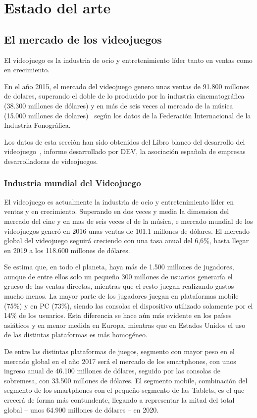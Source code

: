 \chapter{Estado del arte}
\label{chap:estado del arte}
\section{El mercado de los videojuegos}
El videojuego es la industria de ocio y entretenimiento líder tanto en ventas como en crecimiento.

En el año 2015, el mercado del videojuego genero unas ventas de 91.800 millones de dolares, superando el doble de lo producido por la industria cinematográfica (38.300 millones de dólares) y en más de seis veces al mercado de la música (15.000 millones de dolares)~\cite{libro_blanco} según los datos de la Federación Internacional de la Industria Fonográfica.

Los datos de esta sección han sido obtenidos del Libro blanco del desarrollo del videojuego~\cite{libro_blanco}, informe desarrollado por DEV, la asociación española de empresas desarrolladoras de videojuegos.

\subsection{Industria mundial del Videojuego}
El videojuego es actualmente la industria de ocio y entretenimiento líder en ventas y en crecimiento. Superando en dos veces y media la dimension del mercado del cine y en mas de seis veces el de la música, e mercado mundial de los videojuegos generó en 2016 unas ventas de 101.1 millones de dólares. El mercado global del videojuego seguirá creciendo con una tasa anual del 6,6\%, hasta llegar en 2019 a los 118.600 millones de dólares.

Se estima que, en todo el planeta, haya más de 1.500 millones de jugadores, aunque de entre ellos solo un pequeño 300 millones de usuarios generaría el grueso de las ventas directas, mientras que el resto juegan realizando gastos mucho menos. La mayor parte de los jugadores juegan en plataformas mobile (75\%) y en PC (73\%), siendo las consolas el dispositivo utilizado solamente por el 14\% de los usuarios. Esta diferencia se hace aún más evidente en los países asiáticos y en menor medida en Europa, mientras que en Estados Unidos el uso de las distintas plataformas es más homogéneo.

De entre las distintas plataformas de juegos, segmento con mayor peso en el mercado global en el año 2017 será el mercado de los smartphones, con unos ingreso anual de 46.100 millones de dólares, seguido por las consolas de sobremesa, con 33.500 millones de dólares. El segmento mobile, combinación del segmento de los smartphones con el pequeño segmento de las Tablets, es el que crecerá de forma más contundente, llegando a representar la mitad del total global – unos 64.900 millones de dólares – en 2020.

